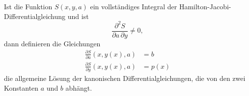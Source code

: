 \begin{satz}[Jacobi]
Ist die Funktion $S(x,y,a)$ ein vollständiges Integral der
Hamilton-Jacobi-Differentialgleichung und ist
\begin{equation}
\frac{\partial^2 S}{\partial a\,\partial y}\ne 0,
\label{buch:hamiltonjacobi:jacobi:satz:jacobi:eqn:regularitaet}
\end{equation}
dann definieren die Gleichungen
\begin{equation}
\begin{aligned}
\frac{\partial S}{\partial a}(x,y(x),a) &= b \\
\frac{\partial S}{\partial y}(x,y(x),a) &= p(x)
\end{aligned}
\label{buch:hamiltonjacobi:jacobi:satz:jacobi:eqn:equations}
\end{equation}
die allgemeine Lösung der kanonischen Differentialgleichungen, die von
den zwei Konstanten $a$ und $b$ abhängt.
\end{satz}

